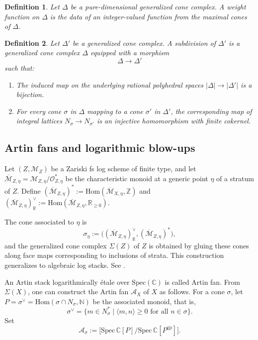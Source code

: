 \documentclass{article}
\def\N{{\mathbb{N}}}
\def\oM{\overline{\mathcal{M}}}
\def\Z{\mathbb{Z}}
\def\C{\mathbb{C}}
\def\R{\mathbb{R}}
\newtheorem{definition}{Definition}[section]
\begin{document}
\begin{definition}
    Let $\Delta$ be a pure-dimensional generalized cone complex. A weight function on $\Delta$ is the data of an integer-valued function from the maximal cones of $\Delta$.
\end{definition}

\begin{definition}
    Let $\Delta'$ be a generalized cone complex. A subdivision of $\Delta'$ is a generalized cone complex $\Delta$ equipped with a morphism
    $$ 
    \Delta \longrightarrow \Delta'
    $$
    such that:
    \begin{enumerate}
        \item[$\bullet$] The induced map on the underlying rational polyhedral spaces $|\Delta| \to |\Delta'|$ is a bijection. 
        \item[$\bullet$] For every cone $\sigma$ in $\Delta$ mapping to a cone $\sigma'$ in $\Delta'$, the corresponding map of integral lattices $N_{\sigma} \to N_{\sigma'}$ is an injective homomorphism with finite cokernel. 
    \end{enumerate}
\end{definition}

\subsection{Artin fans and logarithmic blow-ups}


Let $(Z,\mathcal{M}_Z)$ be a Zariski fs log scheme of finite type, and let 
$
\oM_{Z,\eta} = \mathcal{M}_{Z,\eta}/\mathcal{O}_{Z,\eta}^*
$
be the characteristic monoid at a generic point $\eta$ of a stratum of $Z$. 
Define
$
(\oM_{Z,\eta})^* := \mathrm{Hom}(\oM_{X,\eta}, \Z)$ and 
$ 
(\oM_{Z,\eta})_\R^\vee := \mathrm{Hom}(\oM_{Z,\eta}, \R_{\ge 0}).
$

The cone associated to $\eta$ is 
\[
\sigma_\eta := \bigl((\oM_{Z,\eta})_\R^\vee, (\oM_{Z,\eta})^*\bigr),
\]
and the generalized cone complex $\Sigma(Z)$ of $Z$ is obtained by gluing these cones along face maps corresponding to inclusions of strata. This construction generalizes to algebraic log stacks. See \cite[Section 2.1.4]{ACGSI}. 


An Artin stack logarithmically étale over $\mathrm{Spec}(\C)$ is called Artin fan. From $\Sigma(X)$, one can construct the Artin fan $\mathcal{A}_X$ of $X$ as follows. 
For a cone $\sigma$, let
$
P = \sigma^\vee= \mathrm{Hom}(\sigma \cap N_\sigma, \N)
$
be the associated monoid, that is,
\[
\sigma^\vee = \{ m \in N_\sigma^* \mid \langle m, n \rangle \geq 0 \text{ for all } n \in \sigma \}.
\]
Set
\[
\mathcal{A}_\sigma := \bigl[ \mathrm{Spec}\, \mathbb{C}[P] \big/ \mathrm{Spec}\, \mathbb{C}[P^{\mathrm{gp}}] \bigr].
\]
\end{document}
